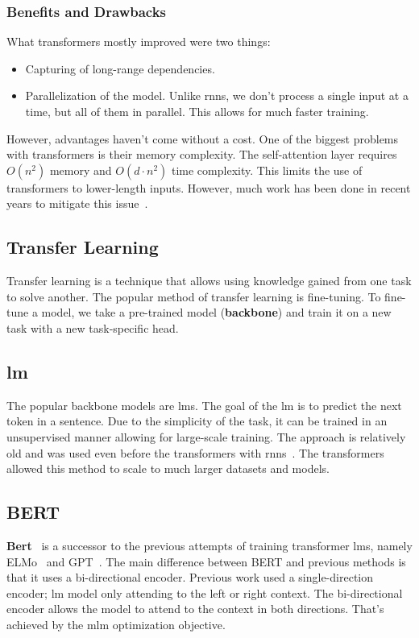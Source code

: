 \subsubsection{Benefits and Drawbacks}
\label{sec:benefits-and-drawbacks}
What transformers mostly improved were two things:
\begin{itemize}
    \item Capturing of long-range dependencies.
    \item Parallelization of the model. Unlike \acp{rnn}, we don't process a single input at a time,
          but all of them in parallel. This allows for much faster training.
\end{itemize}
However, advantages haven't come without a cost. One of the biggest problems with transformers
is their memory complexity. The self-attention layer requires $O(n^2)$ memory and $O(d \cdot n^2)$ time complexity.
This limits the use of transformers to lower-length inputs. However, much work has been done in recent years to mitigate this issue~\parencite{zhuangSurveyEfficientTraining2023}.

\subsection{Transfer Learning}
\label{sec:transfer-learning}
Transfer learning is a technique that allows using knowledge gained from one task to solve another.
The popular method of transfer learning is fine-tuning. To fine-tune a model, we take a pre-trained model (\textbf{backbone})
and train it on a new task with a new task-specific head.

\subsection{\acl{lm}}
The popular backbone models are \acfp{lm}. The goal of the \ac{lm} is to predict the next token in a sentence.
Due to the simplicity of the task, it can be trained in an unsupervised manner allowing for large-scale training.
The approach is relatively old and was used even before the transformers with \acp{rnn}~\parencites{daiSemisupervisedSequenceLearning2015}{petersSemisupervisedSequenceTagging2017}.
The transformers allowed this method to scale to much larger datasets and models.

\subsection{BERT}
\textbf{Bert}~\parencite{devlinBERTPretrainingDeep2019a} is a successor to the previous attempts of training transformer \acp{lm}, namely ELMo~\parencite{petersDeepContextualizedWord2018} and GPT~\parencite{Radford2018ImprovingLU}.
The main difference between BERT and previous methods is that it uses a bi-directional encoder.
Previous work used a single-direction encoder; \ac{lm} model only attending to the left or right context.
The bi-directional encoder allows the model to attend to the context in both directions.
That's achieved by the \acf{mlm} optimization objective.

